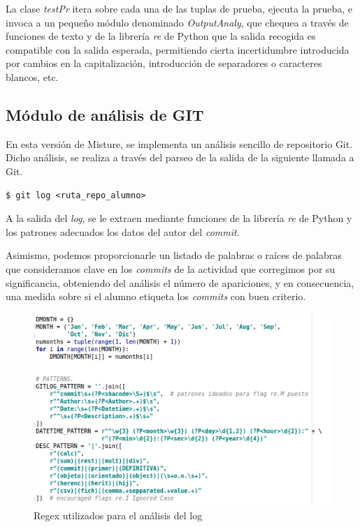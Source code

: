 La clase \textit{testPr} itera sobre cada una de las tuplas de prueba, ejecuta la prueba, e invoca a un pequeño módulo denominado \textit{OutputAnaly}, que chequea a través de funciones de texto y de la librería \textit{re} de Python que la salida recogida es compatible con la salida esperada, permitiendo cierta incertidumbre introducida por cambios en la capitalización, introducción de separadores o caracteres blancos, etc.

\subsection{Módulo de análisis de GIT}


En esta versión de Misture, se implementa un análisis sencillo de repositorio Git. Dicho análisis, se realiza a través del parseo de la salida de la siguiente llamada a Git.
\begin{center}
\begin{verbatim}
$ git log <ruta_repo_alumno>
\end{verbatim}
\end{center}

A la salida del \textit{log}, se le extraen mediante funciones de la librería \textit{re} de Python y los patrones adecuados los datos del autor del \textit{commit}.


Asimismo, podemos proporcionarle un listado de palabras o raíces de palabras que consideramos clave en los \textit{commits} de la actividad que corregimos por su significancia, obteniendo  del análisis el número de apariciones, y en consecuencia, una medida sobre si el alumno etiqueta los \textit{commits} con buen criterio.

\newpage	%

\begin{figure}[H]
   \centering
   \includegraphics[width=16cm]{img/Selection_025_gitlog_patterns}
   \caption{Regex utilizados para el análisis del log}
   \label{figura:reg_analisis_log}
\end{figure}

